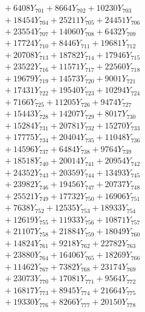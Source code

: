 \documentclass[a4paper,10pt]{article}
\begin{document}
{\begin{align}
&\;  + 6408 Y_{701} + 8664 Y_{702} + 10230 Y_{703} \\[0.3ex]
&\;  + 18454 Y_{704} + 25211 Y_{705} + 24451 Y_{706} \\[0.3ex]
&\;  + 23554 Y_{707} + 14060 Y_{708} + 6432 Y_{709} \\[0.3ex]
&\;  + 17724 Y_{710} + 8446 Y_{711} + 19681 Y_{712} \\[0.3ex]
&\;  + 20708 Y_{713} + 18782 Y_{714} + 17946 Y_{715} \\[0.3ex]
&\;  + 23522 Y_{716} + 11571 Y_{717} + 22560 Y_{718} \\[0.5ex]\allowbreak
&\;  + 19679 Y_{719} + 14573 Y_{720} + 9001 Y_{721} \\[0.3ex]
&\;  + 17431 Y_{722} + 19540 Y_{723} + 10294 Y_{724} \\[0.3ex]
&\;  + 7166 Y_{725} + 11205 Y_{726} + 9474 Y_{727} \\[0.3ex]
&\;  + 15443 Y_{728} + 14207 Y_{729} + 8017 Y_{730} \\[0.3ex]
&\;  + 15284 Y_{731} + 20781 Y_{732} + 15270 Y_{733} \\[0.3ex]
&\;  + 17775 Y_{734} + 20404 Y_{735} + 11048 Y_{736} \\[0.3ex]
&\;  + 14596 Y_{737} + 6484 Y_{738} + 9764 Y_{739} \\[0.3ex]
&\;  + 18518 Y_{740} + 20014 Y_{741} + 20954 Y_{742} \\[0.3ex]
&\;  + 24352 Y_{743} + 20359 Y_{744} + 13493 Y_{745} \\[0.3ex]
&\;  + 23982 Y_{746} + 19456 Y_{747} + 20737 Y_{748} \\[0.5ex]\allowbreak
&\;  + 25521 Y_{749} + 17732 Y_{750} + 16906 Y_{751} \\[0.3ex]
&\;  + 7638 Y_{752} + 12535 Y_{753} + 18933 Y_{754} \\[0.3ex]
&\;  + 12619 Y_{755} + 11933 Y_{756} + 10871 Y_{757} \\[0.3ex]
&\;  + 21107 Y_{758} + 21884 Y_{759} + 18049 Y_{760} \\[0.3ex]
&\;  + 14824 Y_{761} + 9218 Y_{762} + 22782 Y_{763} \\[0.3ex]
&\;  + 23880 Y_{764} + 16406 Y_{765} + 18269 Y_{766} \\[0.3ex]
&\;  + 11462 Y_{767} + 7382 Y_{768} + 23174 Y_{769} \\[0.3ex]
&\;  + 23073 Y_{770} + 17081 Y_{771} + 9564 Y_{772} \\[0.3ex]
&\;  + 16817 Y_{773} + 8945 Y_{774} + 21664 Y_{775} \\[0.3ex]
&\;  + 19330 Y_{776} + 8266 Y_{777} + 20150 Y_{778} \\[0.5ex]\allowbreak

\end{align}}
\end{document}
